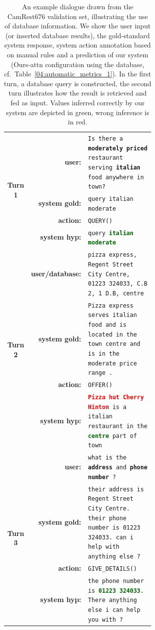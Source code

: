 \begin{table}[t]
    \centering\scriptsize
    \begin{tabular}{crp{0.6\linewidth}}
        \toprule
         \multirow{4}{*}{\bf Turn 1}&\bf user:& \texttt{Is there a \textbf{moderately priced} restaurant serving \textbf{italian} food anywhere in town?} \\
         &\bf system gold: & \texttt{query italian moderate} \\
         &\bf action: & \texttt{QUERY()} \\
         &\bf system hyp: & \texttt{query \textbf{\textcolor{darkgreen}{italian moderate}}}  \\
         \midrule
        \multirow{4}{*}{\bf Turn 2}&\bf user/database:& \texttt{pizza express, Regent Street City Centre, 01223 324033, C.B 2, 1 D.B, centre}  \\
         &\bf system gold:& \texttt{Pizza express serves italian food and is located in the town centre and is in the moderate price range .} \\        
        &\bf action: & \texttt{OFFER()} \\
        &\bf system hyp:& \texttt{\textbf{\textcolor{red}{Pizza hut Cherry Hinton}} is a italian restaurant in the \textbf{\textcolor{darkgreen}{centre}} part of town} \\
         \midrule
        \multirow{4}{*}{\bf Turn 3}&\bf user:& \texttt{what is the \textbf{address} and \textbf{phone number} ?} \\
        &\bf system gold:& \texttt{their address is  Regent Street City Centre. their phone number is 01223 324033. can i help with anything else ?} \\
         &\bf action: & \texttt{GIVE\_DETAILS()} \\
        & \bf system hyp:& \texttt{the phone number is \textbf{\textcolor{darkgreen}{01223 324033}}. There anything else i can help you with ?} \\
        \bottomrule
    \end{tabular}
    \vspace{-2mm}
    \caption{An example dialogue drawn from the CamRest676 validation set, illustrating the use of database information. We show the user input (or inserted database results), the gold-standard system response, system action annotation based on manual rules and a prediction of our system (Ours-attn configuration using the database, cf.~Table~\ref{04:automatic_metrics_1}). In the first turn, a database query is constructed, the second turn illustrates how the result is retrieved and fed as input. Values inferred correctly by our system are depicted in green, wrong inference is in red.}
    \label{04:tab:example}
\end{table}
